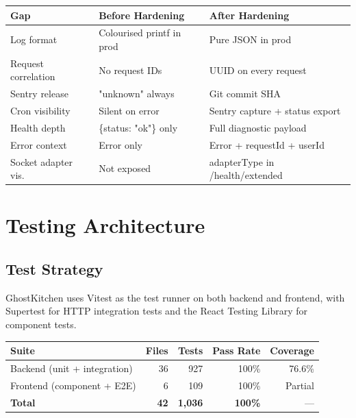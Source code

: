 \documentclass[11pt,a4paper,twoside]{book}
\newcommand{\th}[1]{\textbf{\color{white}#1}}
\begin{document}
\begin{center}\small
\begin{tabular}{p{4cm}p{4.5cm}p{4cm}}
\toprule
\rowcolor{headbg}\th{Gap} & \th{Before Hardening} & \th{After Hardening} \\
\midrule
Log format            & Colourised printf in prod  & Pure JSON in prod \\
\rowcolor{rowalt}Request correlation   & No request IDs             & UUID on every request \\
Sentry release        & "unknown" always           & Git commit SHA \\
\rowcolor{rowalt}Cron visibility       & Silent on error            & Sentry capture + status export \\
Health depth          & \{status: "ok"\} only      & Full diagnostic payload \\
\rowcolor{rowalt}Error context         & Error only                 & Error + requestId + userId \\
Socket adapter vis.   & Not exposed                & adapterType in /health/extended \\
\bottomrule
\end{tabular}
\end{center}

\chapter{Testing Architecture}

\section{Test Strategy}

GhostKitchen uses Vitest as the test runner on both backend and frontend, with
Supertest for HTTP integration tests and the React Testing Library for
component tests.

\begin{center}\small
\begin{tabular}{lrrrr}
\toprule
\rowcolor{headbg}\th{Suite} & \th{Files} & \th{Tests} & \th{Pass Rate} & \th{Coverage} \\
\midrule
Backend (unit + integration) & 36 & 927 & 100\% & 76.6\% \\
\rowcolor{rowalt}Frontend (component + E2E)  & 6  & 109 & 100\% & Partial \\
\textbf{Total}               & \textbf{42} & \textbf{1,036} & \textbf{100\%} & — \\
\bottomrule
\end{tabular}
\end{center}
\end{document}
